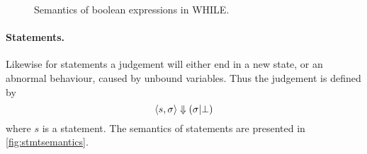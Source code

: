 \begin{figure}[h!]
\inference[EBCst]{}
{}


{}

{}

{}


{}

{}

{}


{}

{}

\caption{Semantics of boolean expressions in WHILE.}
\label{fig:bexprsemantics}
\end{figure}

\paragraph{Statements.}
Likewise for statements a judgement will either end in a new state, or an abnormal behaviour, caused by unbound variables. Thus the judgement is defined by
$$\langle s, \sigma \rangle \Downarrow (\sigma | \bot)$$
where $s$ is a statement.
The semantics of statements are presented in \autoref{fig:stmtsemantics}.


